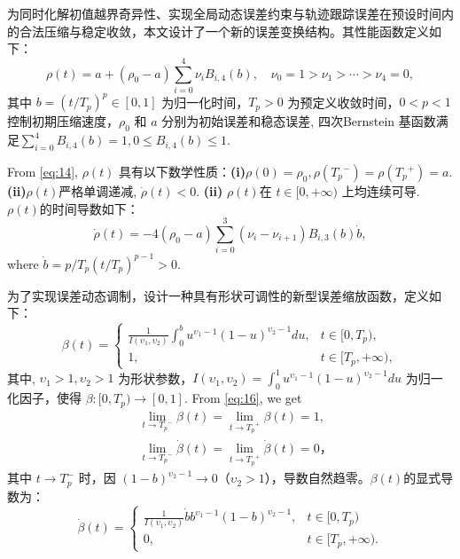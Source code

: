 \documentclass[pdflatex,sn-mathphys-num]{sn-jnl}%
\theoremstyle{thmstyleone}%
\theoremstyle{thmstyletwo}%
\theoremstyle{thmstylethree}%
\begin{document}
为同时化解初值越界奇异性、实现全局动态误差约束与轨迹跟踪误差在预设时间内的合法压缩与稳定收敛，本文设计了一个新的误差变换结构。其性能函数定义如下：
\begin{equation}\label{eq:14}
\rho(t) = a + (\rho_0 - a) \sum_{i=0}^4 \nu_i B_{i,4}( b), \quad \nu_0 = 1 > \nu_1 > \cdots > \nu_4 = 0,
\end{equation}
其中 $ b = \left({t}/{T_p} \right)^p \in [0,1]$ 为归一化时间，$T_p > 0$ 为预定义收敛时间，$0<p<1$ 控制初期压缩速度，$\rho_0$ 和 $a$ 分别为初始误差和稳态误差, 四次Bernstein 基函数满足$
\sum_{i=0}^{4} B_{i,4}( b)=1, 0\le B_{i,4}( b)\le 1$.

From \cref{eq:14}, $\rho(t)$ 具有以下数学性质：\textbf{(i)}$\rho(0) = \rho_0, \rho({T_p}^-)=\rho({T_p}^+) = a$. \textbf{(ii)}$\rho(t)$严格单调递减, $\dot\rho(t) < 0$. \textbf{(ii)} $\rho(t)$在 $t\in [0,+\infty)$ 上均连续可导. $\rho(t)$的时间导数如下：
\begin{equation}\label{eq:15}
\dot{\rho}(t)=-4\left(\rho_{0}-a\right)\sum_{i=0}^{3}(\nu_{i}-\nu_{i+1})B_{i,3}( b)\dot{b},
\end{equation}
where $\dot{b}={p}/{T_{p}}({t}/{T_{p}})^{p-1}>0$.


为了实现误差动态调制，设计一种具有形状可调性的新型误差缩放函数，定义如下：
\begin{equation}\label{eq:16}
\beta(t) =
\begin{cases}
\displaystyle \frac{1}{I (\upsilon_{1}, \upsilon_{2})} \int_0^{ b} u^{\upsilon_{1}-1} (1 - u)^{\upsilon_{2}-1} du, & t \in [0,T_p), \\ 
1, & t \in [T_p,+\infty),
\end{cases}
\end{equation}
其中, $\upsilon_{1} > 1, \upsilon_{2} > 1$ 为形状参数，$I(\upsilon_{1},\upsilon_{2})=\int_0^{1} u^{\upsilon_{1}-1} (1 - u)^{\upsilon_{2}-1} du$ 为归一化因子，使得 $\beta:[0,T_p)\!\to[0,1]$. From \cref{eq:16}, we get
\begin{subequations} \label{eq:17}
	\begin{align}
	&\lim_{t \to {T_p}^-}{\beta}(t) = \lim_{t \to {T_p}^+}{\beta}(t) = 1,\\
	&\lim_{t \to {T_p}^-}\dot{\beta}(t) =\lim_{t \to {T_p}^+}\dot{\beta}(t)=0， 
\end{align}
\end{subequations}
其中 $t\!\to\!T_p^-$ 时，因 $(1-b)^{\upsilon_2-1}\!\to\!0$（$\upsilon_2\!>\!1$），导数自然趋零。$\beta(t)$的显式导数为：
\begin{equation}\label{eq:18}
	\dot{\beta}(t) = 
	\begin{cases}
		\frac{1}{I(\upsilon_{1},\upsilon_{2})} \dot{b}  b^{\upsilon_{1} - 1} (1 -  b)^{\upsilon_{2} - 1}, & t \in [0,T_p) \\
	0, &t \in [T_p,+\infty).
	\end{cases}
	\end{equation} 
\end{document}
